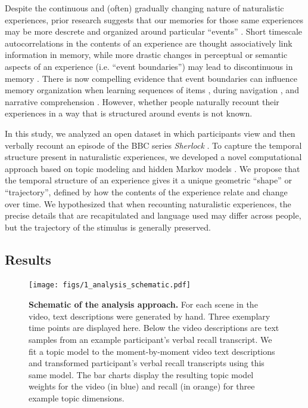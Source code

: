 \documentclass{article}
\begin{document}
{%
Despite the continuous and (often) gradually changing nature of naturalistic experiences, prior research suggests that our memories for those same experiences may be more descrete and organized around particular ``events'' \citep{Radv12, RadvZack11, BrunEtal18}. Short timescale autocorrelations in the contents of an experience are thought associatively link information in memory, while more drastic changes in perceptual or semantic aspects of an experience (i.e. ``event boundaries'') may lead to discontinuous in memory \citep{HeusEtal18, BrunEtal18, Radv12}. There is now compelling evidence that event boundaries can influence memory organization when learning sequences of items \citep{HeusEtal18, DuBrDava13}, during navigation \citep{BrunEtal18}, and narrative comprehension \citep{ZwaaRadv98, EzzyDava11}.  However, whether people naturally recount their experiences in a way that is structured around events is not known.

In this study, we analyzed an open dataset in which participants view and then verbally recount an episode of the BBC series \textit{Sherlock} \citep{ChenEtal17}. To capture the temporal structure present in naturalistic experiences, we developed a novel computational approach based on topic modeling \citep{BleiEtal03} and hidden Markov models \citep{Rabi89, BaldEtal17}. We propose that the temporal structure of an experience gives it a unique geometric ``shape'' or ``trajectory'', defined by how the contents of the experience relate and change over time. We hypothesized that when recounting naturalistic experiences, the precise details that are recapitulated and language used may differ across people, but the trajectory of the stimulus is generally preserved.

\subsection{Results}

\begin{figure}[th!]
\centering
\texttt{[image: figs/1\_analysis\_schematic.pdf]}
\caption{\small \textbf{Schematic of the analysis approach.} For each scene in the video, text descriptions were generated by hand. Three exemplary time points are displayed here.  Below the video descriptions are text samples from an example participant's verbal recall transcript.  We fit a topic model to the moment-by-moment video text descriptions and transformed participant's verbal recall transcripts using this same model. The bar charts display the resulting topic model weights for the video (in blue) and recall (in orange) for three example topic dimensions.}
\label{fig:schematic}
\end{figure}

}
\end{document}
